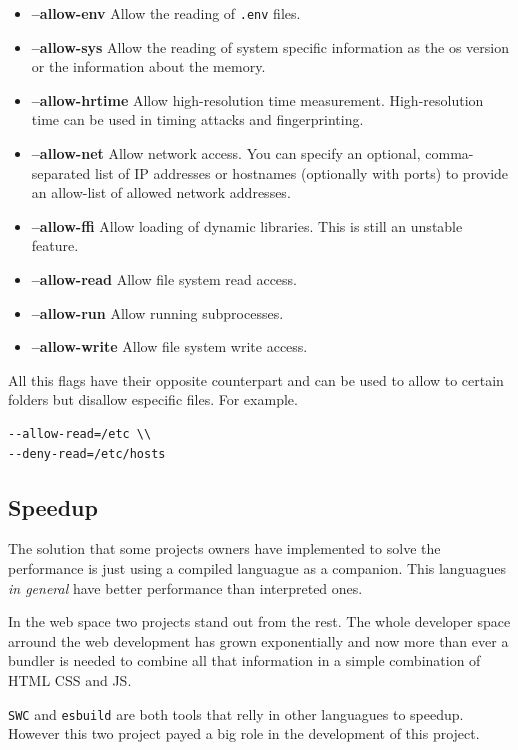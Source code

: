 \documentclass[12pt, letterpaper]{article}
\begin{document}
\begin{multicols}{2}
    \begin{itemize}
        \item \textbf{–allow-env} Allow the reading of \verb|.env| files.
        \item \textbf{–allow-sys} Allow the reading of system specific information as the os version or the information about the memory.
        \item \textbf{–allow-hrtime} Allow high-resolution time measurement. High-resolution time can be used in timing attacks and fingerprinting.
        \item \textbf{–allow-net} Allow network access. You can specify an optional, comma-separated list of IP addresses or hostnames (optionally with ports) to provide an allow-list of allowed network addresses.
        \item \textbf{–allow-ffi} Allow loading of dynamic libraries. This is still an unstable feature.
        \item \textbf{–allow-read} Allow file system read access.
        \item \textbf{–allow-run} Allow running subprocesses.
        \item \textbf{–allow-write} Allow file system write access.
    \end{itemize}

    All this flags have their opposite counterpart and can be used to allow to certain folders but disallow especific files. For example.

    \begin{lstlisting}
--allow-read=/etc \\
--deny-read=/etc/hosts
    \end{lstlisting}


    \subsection{Speedup}

    The solution that some projects owners have implemented to solve the performance is just using a compiled languague as a companion. This languagues \textit{in general} have better performance than interpreted ones.

    In the web space two projects stand out from the rest. The whole developer space arround the web development has grown exponentially and now more than ever a bundler is needed to combine all that information in a simple combination of HTML CSS and JS.

    \verb|SWC| and \verb|esbuild| are both tools that relly in other languagues to speedup. However this two project payed a big role in the development of this project.


\end{multicols}
\end{document}

